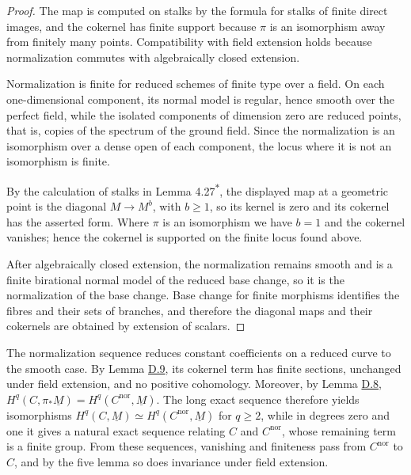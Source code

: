 \documentclass[11pt]{article}
\newcommand{\bpout}[1]{#1\textsuperscript{\hyperlink{bp-outside}{\ensuremath{\ast}}}}
\begin{document}
\begin{proof}[{Proof}]\label{bp206}%
The map is computed on stalks by the formula for stalks of finite direct images, and the cokernel has finite support because \(\pi\) is an isomorphism away from finitely many points. Compatibility with field extension holds because normalization commutes with algebraically closed extension.

Normalization is finite for reduced schemes of finite type over a field.  On each one-dimensional component, its normal model is regular, hence smooth over the perfect field, while the isolated components of dimension zero are reduced points, that is, copies of the spectrum of the ground field.  Since the normalization is an isomorphism over a dense open of each component, the locus where it is not an isomorphism is finite.

By the calculation of stalks in Lemma \bpout{4.27}, the displayed map at a geometric point is the diagonal \(M\to M^b\), with \(b\geq1\), so its kernel is zero and its cokernel has the asserted form.  Where \(\pi\) is an isomorphism we have \(b=1\) and the cokernel vanishes; hence the cokernel is supported on the finite locus found above.

After algebraically closed extension, the normalization remains smooth and is a finite birational normal model of the reduced base change, so it is the normalization of the base change.  Base change for finite morphisms identifies the fibres and their sets of branches, and therefore the diagonal maps and their cokernels are obtained by extension of scalars.
\end{proof}

\label{bp207}%
The normalization sequence reduces constant coefficients on a reduced curve to the smooth case. By Lemma \hyperref[bp202]{D.9}, its cokernel term has finite sections, unchanged under field extension, and no positive cohomology. Moreover, by Lemma \hyperref[bp199]{D.8}, \(H^q(C,\pi_*\underline M)=H^q(C^{\mathrm{nor}},\underline M)\). The long exact sequence therefore yields isomorphisms \(H^q(C,\underline M)\simeq H^q(C^{\mathrm{nor}},\underline M)\) for \(q\geq2\), while in degrees zero and one it gives a natural exact sequence relating \(C\) and \(C^{\mathrm{nor}}\), whose remaining term is a finite group. From these sequences, vanishing and finiteness pass from \(C^{\mathrm{nor}}\) to \(C\), and by the five lemma so does invariance under field extension.
\end{document}
